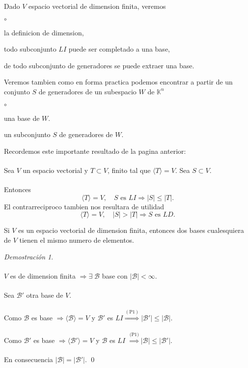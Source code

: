 \documentclass{article}
\theoremstyle{definition}
\theoremstyle{definition}
\theoremstyle{remark}
\newtheorem*{demo}{Demostración}
\begin{document}
                       



Dado $V$ espacio vectorial de dimension finita, veremos 
\begin{list}{$\circ$}{}  
\item la definicion de dimension, 
\item todo subconjunto $LI$ puede ser completado a una base, 
\item de todo subconjunto de generadores se puede extraer una base.
\end{list}
Veremos tambien como en forma practica podemos encontrar a partir de un conjunto $S$ de generadores de un subespacio $W$ de $\mathbb{K}^n$
\begin{list}{$\circ$}{}  
\item una base de $W$.
\item un subconjunto $S$ de generadores de $W$.
\end{list}

Recordemos este importante resultado de la pagina anterior: \\\\ Sea $V$ un espacio vectorial y $T \subset V$, finito tal que $\langle T \rangle = V$. Sea $S \subset V$. \\\\ Entonces \begin{equation}
  \langle T \rangle =V, \quad S \text{ es } LI \Rightarrow |S| \leq |T|. \tag{P1}
\end{equation}
El contrarreciproco tambien nos resultara de utilidad \begin{equation}
  \langle T \rangle = V, \quad |S| > |T| \Rightarrow S \text{ es }LD. \tag{P2}
\end{equation}
\begin{corol}
  Si $V$ es un espacio vectorial de dimension finita, entonces dos bases cualesquiera de $V$ tienen el mismo numero de elementos.
\end{corol}
\begin{demo} \; \\\\
  $V$ es de dimension finita $\Rightarrow \exists \; \mathcal{B}$ base con $|\mathcal{B}|<\infty$. \\\\ Sea $\mathcal{B}'$ otra base de $V$. \\\\ Como $\mathcal{B}$ es base $\Rightarrow \langle \mathcal{B} \rangle =V$ y $\mathcal{B}'$ es $LI \overset{(\text{P1})}{\Rightarrow} |\mathcal{B'}| \leq |\mathcal{B}|$. \\\\ 
Como $\mathcal{B}'$ es base $\Rightarrow \langle \mathcal{B}' \rangle =V$ y $\mathcal{B}$ es $LI$ $\overset{\text{(P1)}}{\Rightarrow} |\mathcal{B}| \leq |\mathcal{B}'|. $
\\\\
En consecuencia $|\mathcal{B}|=|\mathcal{B}'|.$ \qed 
\end{demo} \pagebreak
\end{document}
